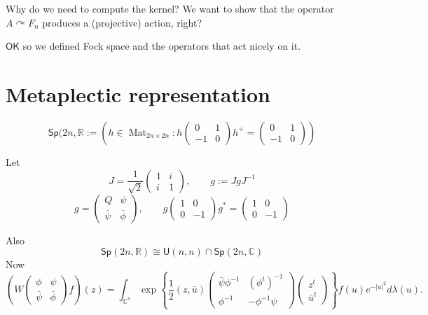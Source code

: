 \begin{question}[Dani]\leavevmode
	Why do we need to compute the kernel? We want to show that the operator $A\curvearrowright F_n$ produces a (projective) action, right?
\end{question}

\begin{thing7}{$\mathsf{OK}$}\leavevmode
	so we defined Fock space and the operators that act nicely on it.
\end{thing7}


\section{Metaplectic representation}

\begin{defn}\leavevmode
	\[\mathsf{Sp}(2n,\mathbb{R}:=\left( h\in\operatorname{Mat}_{2n\times 2n}:h \begin{pmatrix} 0&1\\-1&0 \end{pmatrix}h^+=\begin{pmatrix} 0&1\\-1&0 \end{pmatrix}   \right) \]
\end{defn}

Let
\[J=\frac{1}{\sqrt{2} }\begin{pmatrix} 1&i\\i&1 \end{pmatrix} , \qquad g:=Jg J^{-1}\]\[g=\begin{pmatrix} Q&\psi\\\bar{\psi} &\bar{\phi}  \end{pmatrix} ,\qquad g \begin{pmatrix} 1&0\\0&-1 \end{pmatrix} g^* =\begin{pmatrix} 1&0\\0&-1 \end{pmatrix} \]

Also 
\[\mathsf{Sp}(2n,\mathbb{R})\cong \mathsf{U}(n,n) \cap \mathsf{Sp}(2n,\mathbb{C})\]
Now
\[\left(W\begin{pmatrix} \phi&\psi\\\bar{\psi} &\bar{\phi}  \end{pmatrix} f\right)(z)=\int_{\mathbb{C}^{n}}\operatorname{exp} \left\{ \frac{1}{2}(z,\bar{u} )\begin{pmatrix} \bar{\psi} \phi^{-1}&(\phi^t)^{-1}\\\phi^{-1}&-\phi^{-1}\psi \end{pmatrix} \begin{pmatrix} z^t\\\bar{u} ^t \end{pmatrix}  \right\} f(u)e^{-|u|^2}d \lambda(u).\]

